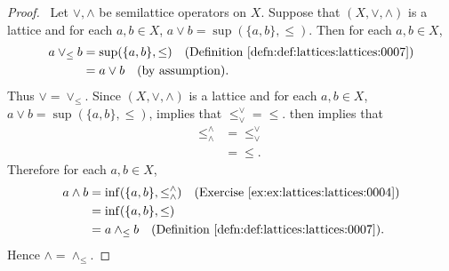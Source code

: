 \documentclass{book}
\begin{document}
	\begin{proof}\
		Let $\vee, \wedge$ be semilattice operators on $X$. Suppose that $(X, \vee, \wedge)$ is a lattice and for each $a,b \in X$, $a \vee b = \sup(\{a,b\}, \leq)$.
		Then for each $a,b \in X$,
		\begin{align*}
			a \vee_{\leq} b
			& = \sup(\{a,b\}, \leq) \quad \text{(\rd{def:lattices:lattices:0007})} \\
			& = a \vee b \quad \text{(by assumption)}.
		\end{align*}
		Thus $\vee = \vee_{\leq}$. Since $(X, \vee, \wedge)$ is a lattice and for each $a,b \in X$, $a \vee b = \sup(\{a,b\}, \leq)$,  implies that $\leq_{\vee}^{\vee} = \leq$.   then implies that 
		\begin{align*}
			\leq_{\wedge}^{\wedge} 
			& = \leq_{\vee}^{\vee} \\
			& = \leq.
		\end{align*}
		Therefore for each $a,b \in X$, 
		\begin{align*}
			a \wedge b
			& = \inf(\{a,b\}, \leq_{\wedge}^{\wedge}) \quad \text{(\rex{ex:lattices:lattices:0004})} \\
			& = \inf(\{a,b\}, \leq) \\
			& = a \wedge_{\leq} b \quad \text{(\rd{def:lattices:lattices:0007})}.
		\end{align*}
		Hence $\wedge = \wedge_{\leq}$.
	\end{proof}
	
	
	
	
	
	
	
	
	
	
	
	
	
	
	
	
	
	
	
	
	
	
	
	
	
	
	
	
	
	
	
	
	
	
	
	
	
	
	
	
	
	
	
	
	
	
	
	
	
\end{document}
